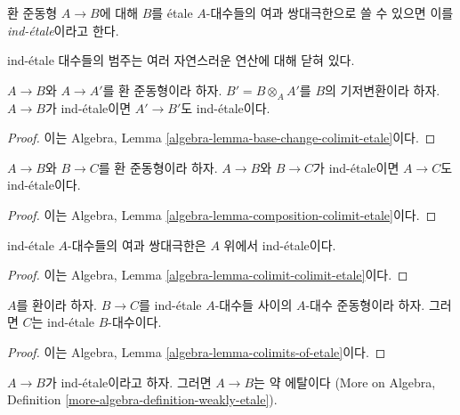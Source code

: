 \begin{definition}
\label{definition-ind-etale}
환 준동형 $A \to B$에 대해 $B$를 \'etale $A$-대수들의
여과 쌍대극한으로 쓸 수 있으면 이를 {\it ind-\'etale}이라고 한다.
\end{definition}

\noindent
ind-\'etale 대수들의 범주는 여러 자연스러운 연산에 대해 닫혀 있다.

\begin{lemma}
\label{lemma-base-change-ind-etale}
$A \to B$와 $A \to A'$를 환 준동형이라 하자.
$B' = B \otimes_A A'$를 $B$의 기저변환이라 하자.
$A \to B$가 ind-\'etale이면 $A' \to B'$도 ind-\'etale이다.
\end{lemma}

\begin{proof}
이는 Algebra, Lemma \ref{algebra-lemma-base-change-colimit-etale}이다.
\end{proof}

\begin{lemma}
\label{lemma-composition-ind-etale}
$A \to B$와 $B \to C$를 환 준동형이라 하자.
$A \to B$와 $B \to C$가 ind-\'etale이면
$A \to C$도 ind-\'etale이다.
\end{lemma}

\begin{proof}
이는 Algebra, Lemma \ref{algebra-lemma-composition-colimit-etale}이다.
\end{proof}

\begin{lemma}
\label{lemma-ind-ind-etale}
ind-\'etale $A$-대수들의 여과 쌍대극한은 $A$ 위에서 ind-\'etale이다.
\end{lemma}

\begin{proof}
이는 Algebra, Lemma \ref{algebra-lemma-colimit-colimit-etale}이다.
\end{proof}

\begin{lemma}
\label{lemma-ind-etale-permanence}
$A$를 환이라 하자. $B \to C$를 ind-\'etale $A$-대수들 사이의
$A$-대수 준동형이라 하자. 그러면 $C$는 ind-\'etale $B$-대수이다.
\end{lemma}

\begin{proof}
이는 Algebra, Lemma \ref{algebra-lemma-colimits-of-etale}이다.
\end{proof}

\begin{lemma}
\label{lemma-ind-etale-implies}
$A \to B$가 ind-\'etale이라고 하자. 그러면 $A \to B$는 약 에탈이다
(More on Algebra, Definition \ref{more-algebra-definition-weakly-etale}).
\end{lemma}

